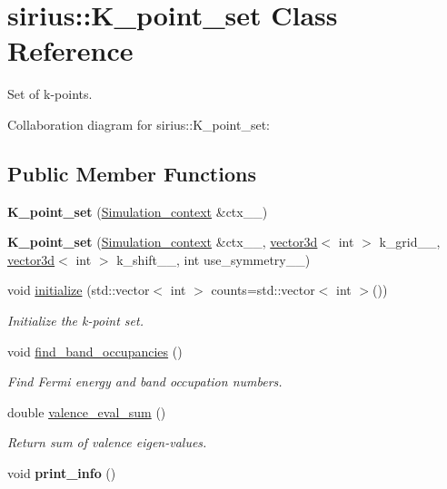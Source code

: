 \hypertarget{classsirius_1_1_k__point__set}{}\section{sirius\+:\+:K\+\_\+point\+\_\+set Class Reference}
\label{classsirius_1_1_k__point__set}


Set of k-\/points.  




Collaboration diagram for sirius\+:\+:K\+\_\+point\+\_\+set\+:
\subsection*{Public Member Functions}
\begin{DoxyCompactItemize}
\item 
\hypertarget{classsirius_1_1_k__point__set_a7d5eefbac413dd2e39cf8d1742cf435a}{}{\bfseries K\+\_\+point\+\_\+set} (\hyperlink{classsirius_1_1_simulation__context}{Simulation\+\_\+context} \&ctx\+\_\+\+\_\+)\label{classsirius_1_1_k__point__set_a7d5eefbac413dd2e39cf8d1742cf435a}

\item 
\hypertarget{classsirius_1_1_k__point__set_a0317eadcd4e671c8bcbefc6101e760e2}{}{\bfseries K\+\_\+point\+\_\+set} (\hyperlink{classsirius_1_1_simulation__context}{Simulation\+\_\+context} \&ctx\+\_\+\+\_\+, \hyperlink{classgeometry3d_1_1vector3d}{vector3d}$<$ int $>$ k\+\_\+grid\+\_\+\+\_\+, \hyperlink{classgeometry3d_1_1vector3d}{vector3d}$<$ int $>$ k\+\_\+shift\+\_\+\+\_\+, int use\+\_\+symmetry\+\_\+\+\_\+)\label{classsirius_1_1_k__point__set_a0317eadcd4e671c8bcbefc6101e760e2}

\item 
void \hyperlink{classsirius_1_1_k__point__set_a403308ec76ef56c066de002f9b5714ae}{initialize} (std\+::vector$<$ int $>$ counts=std\+::vector$<$ int $>$())
\begin{DoxyCompactList}\small\item\em Initialize the k-\/point set. \end{DoxyCompactList}\item 
void \hyperlink{classsirius_1_1_k__point__set_aab8d5e8b8a27bdcbbdf27ac6a31cb230}{find\+\_\+band\+\_\+occupancies} ()
\begin{DoxyCompactList}\small\item\em Find Fermi energy and band occupation numbers. \end{DoxyCompactList}\item 
double \hyperlink{classsirius_1_1_k__point__set_af80698a4a83168d356b81c89f92ca17a}{valence\+\_\+eval\+\_\+sum} ()
\begin{DoxyCompactList}\small\item\em Return sum of valence eigen-\/values. \end{DoxyCompactList}\item 
\hypertarget{classsirius_1_1_k__point__set_ac82770177af2e494fc194f784b5d5414}{}void {\bfseries print\+\_\+info} ()\label{classsirius_1_1_k__point__set_ac82770177af2e494fc194f784b5d5414}


\end{DoxyCompactItemize}
